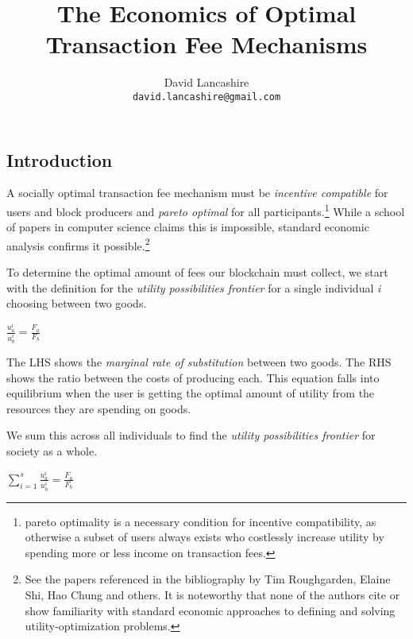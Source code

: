 \documentclass[oneside]{article}   	%
\title{The Economics of Optimal Transaction Fee Mechanisms}
\author{
  David Lancashire\\
  \texttt{david.lancashire@gmail.com}\\
}
\begin{document}
\maketitle


\subsection*{Introduction}

A socially optimal transaction fee mechanism must be \textit{incentive compatible} for users and block producers and \textit{pareto optimal} for all participants.\footnote{pareto optimality is a necessary condition for incentive compatibility, as otherwise a subset of users always exists who costlessly increase utility by spending more or less income on transaction fees.} While a school of papers in computer science claims this is impossible, standard economic analysis confirms it possible.\footnote{See the papers referenced in the bibliography by Tim Roughgarden, Elaine Shi, Hao Chung and others. It is noteworthy that none of the authors cite or show familiarity with standard economic approaches to defining and solving utility-optimization problems.}

To determine the optimal amount of fees our blockchain must collect, we start with the definition for the \textit{utility possibilities frontier} for a single individual \textit{i} choosing between two goods.

\LARGE
\begin{adjustwidth}{1.5em}{1.5em} 
\begin{math}
\frac{u_a^i}{u_b^i} = \frac{F_a}{F_b}
\end{math}
\end{adjustwidth}
\normalsize

The LHS shows the \textit{marginal rate of substitution} between two goods. The RHS shows the ratio between the costs of producing each. This equation falls into equilibrium when the user is getting the optimal amount of utility from the resources they are spending on goods.

We sum this across all individuals to find the \textit{utility possibilities frontier} for society as a whole.

\LARGE
\begin{adjustwidth}{1.5em}{1.5em} 
\begin{math}
\sum_{i=1}^{s} \frac{u_a^i}{u_b^i} = \frac{F_a}{F_b}
\end{math}
\end{adjustwidth}
\normalsize
\end{document}
